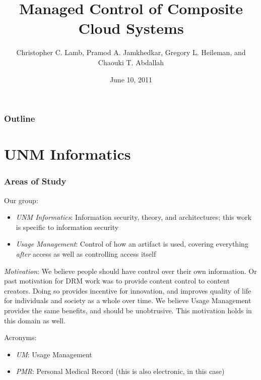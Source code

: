 \documentclass[t, 10pt]{beamer}
\title{Managed Control of Composite Cloud Systems}
\author [Chris]{Christopher C. Lamb, Pramod A. Jamkhedkar, Gregory L. Heileman, and Chaouki T. Abdallah}
\institute[University of New Mexico]{
\inst {}Department of Electrical and Computer Engineering\\
University of New Mexico}
\date{June 10, 2011}
\begin{document}
\begin{frame}
\titlepage
\end{frame}


\begin{frame}
\frametitle{Outline}
\tableofcontents 
\end{frame}

\section{UNM Informatics}
\begin{frame}
\frametitle{Areas of Study}

Our group:
\begin{itemize}
\item \textit{UNM Informatics}: Information security, theory, and architectures; this work is specific to information security 
\item \textit{Usage Management}: Control of how an artifact is used, covering everything \textit{after} access as well as controlling access itself
\end{itemize}
\pause

\textit{Motivation}: We believe people should have control over their own information.  Or past motivation for DRM work was to provide content control to content creators.  Doing so provides incentive for innovation, and improves quality of life for individuals and society as a whole over time.  We believe Usage Management provides the same benefits, and should be unobtrusive.
\newline
\newline
This motivation holds in this domain as well.
\pause

Acronyms:
\begin{itemize}
\item \textit{UM}: Usage Management
\item \textit{PMR}: Personal Medical Record (this is also electronic, in this case)
\end{itemize}

\end{frame}
\end{document}
